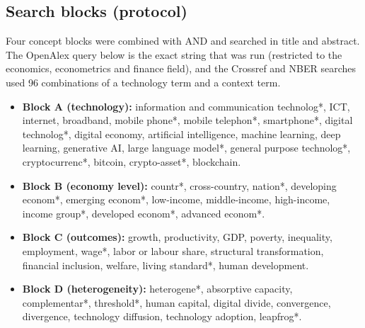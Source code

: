\subsection*{Search blocks (protocol)}
Four concept blocks were combined with AND and searched in title and abstract. The OpenAlex query below is the exact string that was run (restricted to the economics, econometrics and finance field), and the Crossref and NBER searches used 96 combinations of a technology term and a context term.

{\footnotesize\begin{itemize}[leftmargin=1.2em,itemsep=2pt]
\item \textbf{Block A (technology):} information and communication technolog*, ICT, internet, broadband, mobile phone*, mobile telephon*, smartphone*, digital technolog*, digital economy, artificial intelligence, machine learning, deep learning, generative AI, large language model*, general purpose technolog*, cryptocurrenc*, bitcoin, crypto-asset*, blockchain.
\item \textbf{Block B (economy level):} countr*, cross-country, nation*, developing econom*, emerging econom*, low-income, middle-income, high-income, income group*, developed econom*, advanced econom*.
\item \textbf{Block C (outcomes):} growth, productivity, GDP, poverty, inequality, employment, wage*, labor or labour share, structural transformation, financial inclusion, welfare, living standard*, human development.
\item \textbf{Block D (heterogeneity):} heterogene*, absorptive capacity, complementar*, threshold*, human capital, digital divide, convergence, divergence, technology diffusion, technology adoption, leapfrog*.
\end{itemize}}

